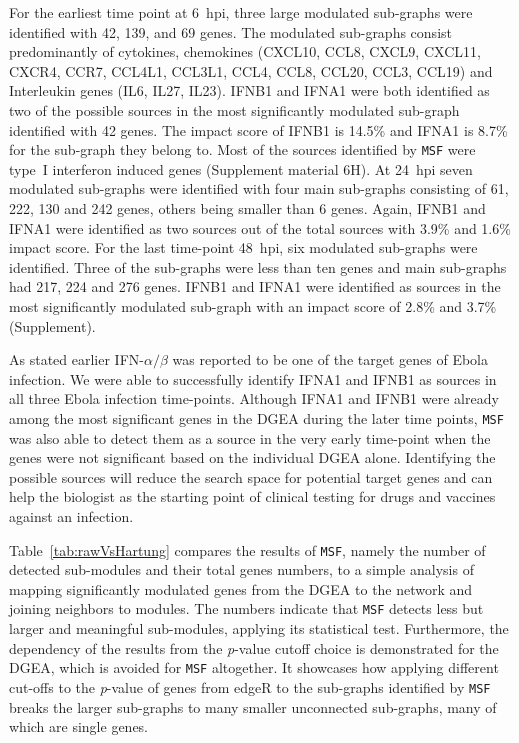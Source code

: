 \documentclass[10pt,a4paper,twocolumn]{article}
\begin{document}
For the earliest time point at 6~hpi, three large modulated sub-graphs were identified with 42,
139, and 69 genes.
The modulated sub-graphs consist predominantly of cytokines, chemokines
(CXCL10, CCL8, CXCL9, CXCL11, CXCR4, CCR7, CCL4L1, CCL3L1, CCL4, CCL8, CCL20, CCL3, CCL19) and Interleukin genes (IL6, IL27, IL23).
IFNB1 and IFNA1 were both identified as two of the possible sources
in the most significantly modulated sub-graph identified with 42 genes. The impact score of IFNB1 is 14.5\% and IFNA1 is 8.7\% for the sub-graph they belong to.
Most of the sources identified by \texttt{MSF} were
type~I interferon induced genes (Supplement material 6H).
At 24~hpi seven modulated sub-graphs were
identified with four main sub-graphs consisting
of 61, 222, 130 and 242 genes, others being smaller than 6 genes. Again, IFNB1
and IFNA1 were identified as two sources out of the total sources with 3.9\% and 1.6\% impact score. For the last time-point 48~hpi,
six modulated sub-graphs were identified. Three of the sub-graphs were
less than ten genes and main sub-graphs had 217, 224 and 276 genes. IFNB1 and IFNA1 were identified as sources in
the most significantly modulated sub-graph with an impact score of 2.8\% and 3.7\% (Supplement).

As stated earlier IFN-$\alpha / \beta$ was reported to be one of the target
genes of Ebola infection. We were able to successfully identify IFNA1 and IFNB1 as
sources in all three Ebola infection time-points. Although IFNA1 and IFNB1 were already among the most
significant genes in the DGEA during the later time points, \texttt{MSF} was
also able to detect them as a source in the very early time-point when the
genes were not significant based on the individual DGEA alone. Identifying
the possible sources will reduce the search space for potential target
genes and can help the biologist as the starting point of clinical testing
for drugs and vaccines against an infection.

Table~\ref{tab:rawVsHartung} compares the results of \texttt{MSF}, namely
the number of detected sub-modules and their total genes numbers, to a
simple analysis of mapping significantly modulated genes from the DGEA to
the network and joining neighbors to modules. The numbers indicate that
\texttt{MSF} detects less but larger and meaningful sub-modules, applying its statistical
test. Furthermore, the dependency of the results from the \textit{p}-value cutoff
choice is demonstrated for the DGEA, which is avoided for \texttt{MSF}
altogether. It showcases how applying different cut-offs to the \textit{p}-value of genes from edgeR to the sub-graphs identified by \texttt{MSF} breaks the larger sub-graphs to many smaller unconnected sub-graphs, many of which are single genes.
\end{document}
